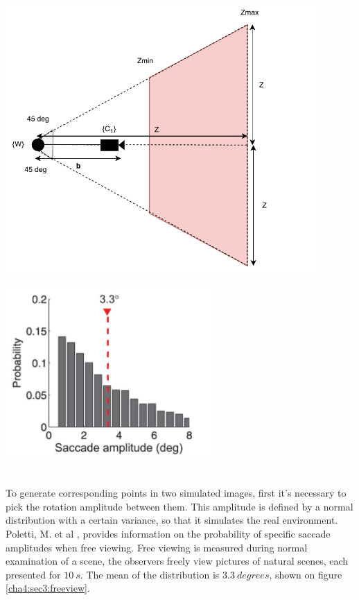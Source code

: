 \begin{minipage}{0.5\textwidth}
	\centering
	\includegraphics[width=0.9\textwidth]{images/rangesim.pdf}
	\label{cha4:sec3:rangesim}
\end{minipage}
\begin{minipage}{0.5\textwidth}
	\centering
	\includegraphics[width=0.6\textwidth]{images/freeview.png}
	\label{cha4:sec3:freeview}
\end{minipage}\\

To generate corresponding points in two simulated images, first it's necessary to pick the rotation amplitude between them. This amplitude is defined by a normal distribution with a certain variance, so that it simulates the real environment. Poletti, M. et al \cite{saccadeamp}, provides information on the probability of specific \gls{saccade} amplitudes when free viewing. Free viewing is measured during normal examination of a scene, the observers freely view pictures of natural scenes, each presented for $10 \ s$. The mean of the distribution is $3.3 \ degrees$, shown on figure \ref{cha4:sec3:freeview}.

